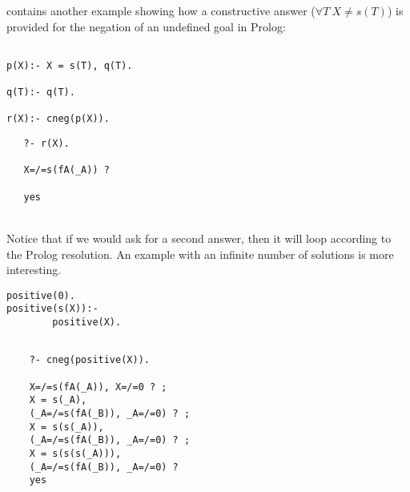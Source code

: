 \documentclass{llncs}
\begin{document}
\cite{Stuckey95} contains another example showing how a constructive
answer ($\forall T ~ X \neq s(T)$) is provided for the negation of an
undefined goal in Prolog:

\begin{minipage}{2in}
\begin{verbatim}

p(X):- X = s(T), q(T).

q(T):- q(T).

r(X):- cneg(p(X)).
\end{verbatim}
\end{minipage}
\begin{minipage}{2in}
\begin{verbatim} 
   ?- r(X).

   X=/=s(fA(_A)) ?

   yes
\end{verbatim} 
\end{minipage}\\



Notice that if we would ask for a second answer, then it will loop
according to the Prolog resolution. An example with an infinite number
of solutions is more interesting.

\begin{minipage}{1.5in}
\begin{verbatim}
positive(0). 
positive(s(X)):-
        positive(X).  
\end{verbatim}
\end{minipage} 
\begin{minipage}{2.5in}
\begin{verbatim} 

    ?- cneg(positive(X)).

    X=/=s(fA(_A)), X=/=0 ? ;
    X = s(_A), 
    (_A=/=s(fA(_B)), _A=/=0) ? ;
    X = s(s(_A)), 
    (_A=/=s(fA(_B)), _A=/=0) ? ;
    X = s(s(s(_A))),
    (_A=/=s(fA(_B)), _A=/=0) ? 
    yes
\end{verbatim} 
\end{minipage}


\end{document}
